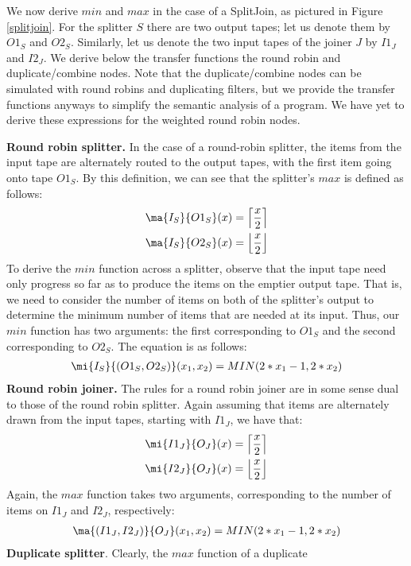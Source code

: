 We now derive $min$ and $max$ in the case of a SplitJoin, as pictured
in Figure \ref{splitjoin}.  For the splitter $S$ there are two output
tapes; let us denote them by $O1_S$ and $O2_S$.  Similarly, let us
denote the two input tapes of the joiner $J$ by $I1_J$ and $I2_J$.  We
derive below the transfer functions the round robin and
duplicate/combine nodes.  Note that the duplicate/combine nodes can be
simulated with round robins and duplicating filters, but we provide
the transfer functions anyways to simplify the semantic analysis of a
program.  We have yet to derive these expressions for the weighted
round robin nodes.

{\bf Round robin splitter.}  In the case of a round-robin splitter, the
items from the input tape are alternately routed to the output tapes,
with the first item going onto tape $O1_S$.  By this definition, we
can see that the splitter's $max$ is defined as follows:
\begin{align*}
\ma{I_S}{O1_S}(x) &= \left\lceil\frac{x}{2}\right\rceil \\
\ma{I_S}{O2_S}(x) &= \left\lfloor\frac{x}{2}\right\rfloor
\end{align*}
To derive the $min$ function across a splitter, observe that the input
tape need only progress so far as to produce the items on the emptier
output tape.  That is, we need to consider the number of items on both
of the splitter's output to determine the minimum number of items that
are needed at its input.  Thus, our $min$ function has two arguments:
the first corresponding to $O1_S$ and the second corresponding to
$O2_S$.  The equation is as follows:
\begin{align*}
\mi{I_S}{(O1_S, O2_S)}(x_1, x_2) = MIN(2*x_1-1, 2*x_2)
\end{align*}
{\bf Round robin joiner.}  The rules for a round robin joiner are in
some sense dual to those of the round robin splitter.  Again assuming
that items are alternately drawn from the input tapes, starting with
$I1_J$, we have that:
\begin{align*}
\mi{I1_J}{O_J}(x) &= \left\lceil\frac{x}{2}\right\rceil \\
\mi{I2_J}{O_J}(x) &= \left\lfloor\frac{x}{2}\right\rfloor
\end{align*}
Again, the $max$ function takes two arguments, corresponding to the
number of items on $I1_J$ and $I2_J$, respectively:
\begin{align*}
\ma{(I1_J, I2_J)}{O_J}(x_1, x_2) = MIN(2*x_1-1, 2*x_2)
\end{align*}
{\bf Duplicate splitter}.  Clearly, the $max$ function of a duplicate
